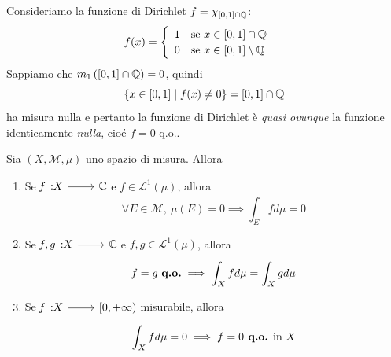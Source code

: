 \begin{example}
	Consideriamo la funzione di Dirichlet $f=\chi_{\left[0,1\right]\cap\mathbb{Q}}$:
	\begin{equation*}
		f(x)=\begin{cases}
			\begin{array}{ll}
				1&\text{se }x\in\left[0,1\right]\cap\mathbb{Q}\\
				0&\text{se }x\in\left[0,1\right]\setminus\mathbb{Q}
			\end{array}
		\end{cases}
	\end{equation*}
Sappiamo che $m_1\left(\left[0,1\right]\cap\mathbb{Q}\right)=0$, quindi
\begin{equation*}
	\left\{x\in\left[0,1\right]\mid f(x)\neq 0\right\}=\left[0,1\right]\cap \mathbb{Q}
\end{equation*}
ha misura nulla e pertanto la funzione di Dirichlet è \textit{quasi ovunque} la funzione identicamente \textit{nulla}, cioé $f=0$ q.o..
\end{example}
\begin{property}
Sia $\left(X,\mathcal{M},\mu\right)$ uno spazio di misura. Allora
\begin{enumerate}
	\item Se $\funz{f}{X}{\complexset}$ e $f\in\mathcal{L}^{1}\left(\mu\right)$, allora
	\begin{equation}
		\forall E\in\mathcal{M},\ \mu\left(E\right)=0\implies \int_Efd\mu=0
	\end{equation}
\item Se $\funz{f,g}{X}{\complexset}$ e $f,g\in\mathcal{L}^{1}\left(\mu\right)$, allora
\begin{equation}
	f=g\ \text{\textbf{q.o.}}\implies \int_Xfd\mu=\int_Xgd\mu
\end{equation}
\item Se $\funz{f}{X}{\left[0,+\infty\right)}$ misurabile, allora
\begin{equation}
	\int_X fd\mu=0\implies f=0 \text{\textbf{ q.o.} in }X
\end{equation}
\end{enumerate}
\end{property}

